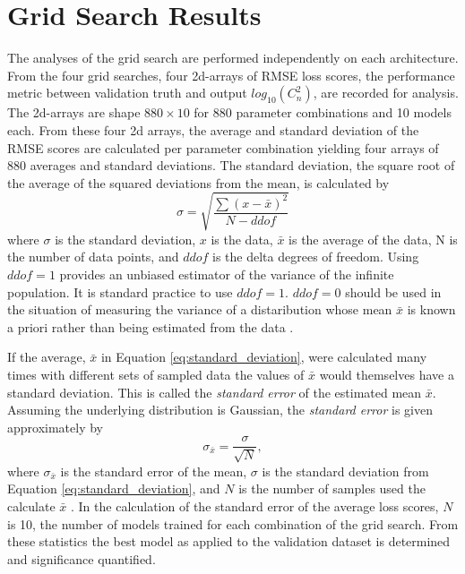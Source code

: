 \section{Grid Search Results}
The analyses of the grid search are performed independently on each architecture. From the four grid searches, four 2d-arrays of RMSE loss scores, the performance metric between validation truth and output $log_{10}(C_{n}^{2})$, are recorded for analysis. The 2d-arrays are shape $880 \times 10$ for 880 parameter combinations and 10 models each. From these four 2d arrays, the average and standard deviation of the RMSE scores are calculated per parameter combination yielding four arrays of 880 averages and standard deviations. The standard deviation, the square root of the average of the squared deviations from the mean, is calculated by
\begin{equation} \label{eq:standard_deviation}
	\sigma = \sqrt{\frac{\sum\left(x - \bar{x}\right)^{2}}{N - ddof}}
\end{equation}
where $\sigma$ is the standard deviation, $x$ is the data, $\bar{x}$ is the average of the data, N is the number of data points, and $ddof$ is the delta degrees of freedom. Using $ddof = 1$ provides an unbiased estimator of the variance of the infinite population. It is standard practice to use $ddof = 1$. $ddof = 0$ should be used in the situation of measuring the variance of a distaribution whose mean $\bar{x}$ is known a priori rather than being estimated from the data \cite{10.5555/1403886}.

If the average, $\bar{x}$ in Equation \ref{eq:standard_deviation}, were calculated many times with different sets of sampled data the values of $\bar{x}$ would themselves have a standard deviation. This is called the \textit{standard error} of the estimated mean $\bar{x}$. Assuming the underlying distribution is Gaussian, the \textit{standard error} is given approximately by
\begin{equation} \label{eq:standard_error}
	\sigma_{\bar{x}} = \frac{\sigma}{\sqrt{N}},
\end{equation}
where $\sigma_{\bar{x}}$ is the standard error of the mean, $\sigma$ is the standard deviation from Equation \ref{eq:standard_deviation}, and $N$ is the number of samples used the calculate $\bar{x}$ \cite{10.5555/1403886}. In the calculation of the standard error of the average loss scores, $N$ is 10, the number of models trained for each combination of the grid search. From these statistics the best model as applied to the validation dataset is determined and significance quantified.

